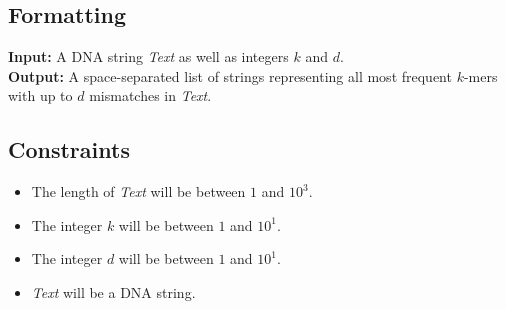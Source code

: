 \documentclass{article}
\begin{document}
\subsection*{Formatting}
\textbf{Input:} A DNA string \emph{Text} as well as integers $k$ and $d$.\\
\noindent \textbf{Output:} A space-separated list of strings representing all most frequent $k$-mers with up to $d$ mismatches in \emph{Text}.

\subsection*{Constraints}
\begin{itemize}
    \item The length of \emph{Text} will be between $1$ and $10^3$.
    \item The integer $k$ will be between $1$ and $10^1$.
    \item The integer $d$ will be between $1$ and $10^1$.
    \item \emph{Text} will be a DNA string.
\end{itemize}
\pagebreak
\end{document}
